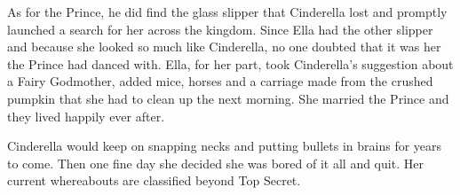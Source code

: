 \documentclass[12pt,letterpaper]{article}
\begin{document}
As for the Prince, he did find the glass slipper that Cinderella lost and promptly launched a search for her across the kingdom. Since Ella had the other slipper and because she looked so much like Cinderella, no one doubted that it was her the Prince had danced with. Ella, for her part, took Cinderella's suggestion about a Fairy Godmother, added mice, horses and a carriage made from the crushed pumpkin that she had to clean up the next morning. She married the Prince and they lived happily ever after. 

Cinderella would keep on snapping necks and putting bullets in brains for years to come.  Then one fine day she decided she was bored of it all and quit. Her current whereabouts are classified beyond Top Secret.
\end{document}
